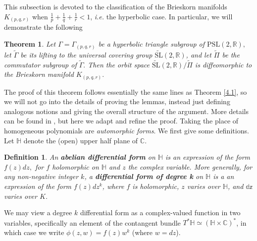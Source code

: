 \documentclass{article}
\newtheorem{theorem}{Theorem}[section]
\newtheorem{definition}{Definition}[section]
\begin{document}
This subsection is devoted to the classification of the Brieskorn manifolds $K_{(p,q,r)}$ when $\frac{1}{p} + \frac{1}{q} + \frac{1}{r} < 1$, \textit{i.e.} the hyperbolic case. In particular, we will demonstrate the following
\begin{theorem}
 \label{Theorem 4.3}
Let $\Gamma = \Gamma_{(p,q,r)}$ be a hyperbolic triangle subgroup of $\mathrm{PSL}(2,\mathbb{R}),$ let $\widetilde{\Gamma}$ be its lifting to the universal covering group $\widetilde{\mathrm{SL}}(2, \mathbb{R})$, and let $\widetilde{\Pi}$ be the commutator subgroup of $\widetilde{\Gamma}.$ Then the orbit space $\widetilde{\mathrm{SL}}(2, \mathbb{R})/\widetilde{\Pi}$ is diffeomorphic to the Brieskorn manifold $K_{(p,q,r)}.$
\end{theorem}
The proof of this theorem follows essentially the same lines as Theorem \ref{4.1}, so we will not go into the details of proving the lemmas, instead just defining analogous notions and giving the overall structure of the argument. More details can be found in \cite{milnor_1975}, but here we adapt and refine the proof. Taking the place of homogeneous polynomials are \textit{automorphic forms}. We first give some definitions. Let $\mathbb{H}$ denote the (open) upper half plane of $\mathbb{C}$.
\begin{definition}
An \textbf{abelian differential form} on $\mathbb{H}$ is an expression of the form $f(z)dz,$ for $f$ holomorphic on $\mathbb{H}$ and $z$ the complex variable. More generally, for any non-negative integer $k$, a \textbf{differential form of degree k} on $\mathbb{H}$ is a an expression of the form $f(z)dz^k$, where $f$ is holomorphic, $z$ varies over $\mathbb{H}$, and $\mathbb{dz}$ varies over $K$.  \end{definition}
We may view a degree $k$ differential form as a complex-valued function in two variables, specifically an element of the contangent bundle $T^*\mathbb{H} \simeq (\mathbb{H} \times \mathbb{C})^*$, in which case we write $\phi(z,w) = f(z)w^k$ (where $w = dz$).
\end{document}
